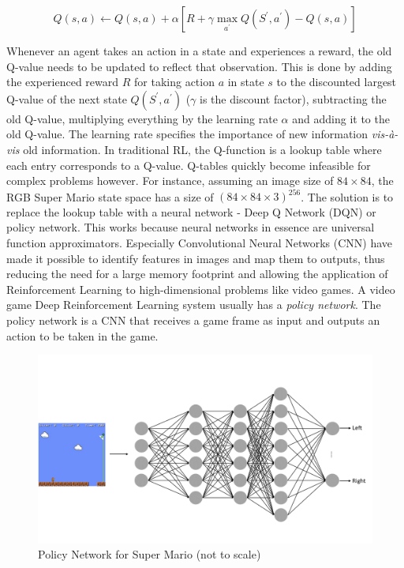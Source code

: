 \documentclass[notitlepage,a4paper,11pt]{article}
\begin{document}
\begin{equation} \label{q_update}
	Q(s,a) \gets Q(s,a) + \alpha \left[ R + \gamma \max\limits_{a^\prime} Q(S^\prime, a^\prime) - Q(s,a) \right]
\end{equation}


Whenever an agent takes an action in a state and experiences a reward, the old Q-value needs to be updated to reflect that observation. This is done by adding the experienced reward $R$ for taking action $a$ in state $s$ to the discounted largest Q-value of the next state $Q(S^\prime, a^\prime)$ ($\gamma$ is the discount factor), subtracting the old Q-value, multiplying everything by the learning rate $\alpha$ and adding it to the old Q-value. The learning rate specifies the importance of new information \textit{vis-à-vis} old information. In traditional RL, the Q-function is a lookup table where each entry corresponds to a Q-value. Q-tables quickly become infeasible for complex problems however. For instance, assuming an image size of $84 \times 84$, the RGB Super Mario state space has a size of $(84 \times 84 \times 3)^{256}$. The solution is to replace the lookup table with a neural network - Deep Q Network (DQN) or policy network. This works because neural networks in essence are universal function approximators. Especially Convolutional Neural Networks (CNN) have made it possible to identify features in images and map them to outputs, thus reducing the need for a large memory footprint and allowing the application of Reinforcement Learning to high-dimensional problems like video games. A video game Deep Reinforcement Learning system usually has a \textit{policy network}. The policy network is a CNN that receives a game frame as input and outputs an action to be taken in the game. 

\begin{figure}[!htb]
\centering
\includegraphics[trim={0 2cm 0 2cm},clip,width=1\linewidth]{figs/deep_rl_video_game.png}
\caption{Policy Network for Super Mario (not to scale)} \label{fig:2}
\end{figure}
\end{document}
